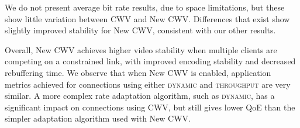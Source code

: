 \documentclass[10pt, acmlarge]{acmart}
\begin{document}
We do not present average bit rate results, due to space limitations, 
but these show little variation between CWV and New CWV. Differences that exist show 
slightly improved stability for New CWV, consistent with our other results.


Overall, New CWV achieves higher video stability when multiple clients are competing on 
a constrained link, with improved encoding stability and decreased rebuffering time. 
We observe that when New CWV is enabled, application metrics achieved for connections 
using either \textsc{dynamic} and \textsc{throughput} are very similar. A more complex 
rate adaptation algorithm, such as \textsc{dynamic}, has a significant impact on 
connections using CWV, but still gives lower QoE than the simpler adaptation algorithm
used with New CWV.

\begin{figure}
    \\
\end{figure}
\end{document}

